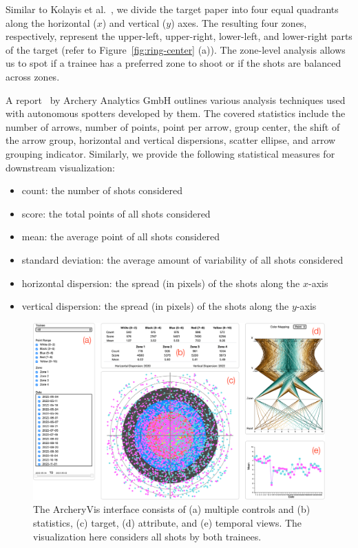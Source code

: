 \documentclass[runningheads]{llncs}
\begin{document}
Similar to Kolayis et al.\ \cite{Kolayis-PSBS14}, we divide the target paper into four equal quadrants along the horizontal ($x$) and vertical ($y$) axes. The resulting four zones, respectively, represent the upper-left, upper-right, lower-left, and lower-right parts of the target (refer to Figure~\ref{fig:ring-center} (a)). The zone-level analysis allows us to spot if a trainee has a preferred zone to shoot or if the shots are balanced across zones. 

A report~\cite{AAG-DAA20} by Archery Analytics GmbH outlines various analysis techniques used with autonomous spotters developed by them. The covered statistics include the number of arrows, number of points, point per arrow, group center, the shift of the arrow group, horizontal and vertical dispersions, scatter ellipse, and arrow grouping indicator. Similarly, we provide the following statistical measures for downstream visualization:

\begin{itemize}
\item count: the number of shots considered
\item score: the total points of all shots considered
\item mean: the average point of all shots considered
\item standard deviation: the average amount of variability of all shots considered
\item horizontal dispersion: the spread (in pixels) of the shots along the $x$-axis
\item vertical dispersion: the spread (in pixels) of the shots along the $y$-axis

\end{itemize}

\begin{figure}[htb]
\begin{center}
\includegraphics[width=1.0\linewidth]{figures/interface.pdf}
\end{center}
\caption{The ArcheryVis interface consists of (a) multiple controls and (b) statistics, (c) target, (d) attribute, and (e) temporal views. The visualization here considers all shots by both trainees.}
\label{fig:interface}
\end{figure}
\end{document}
